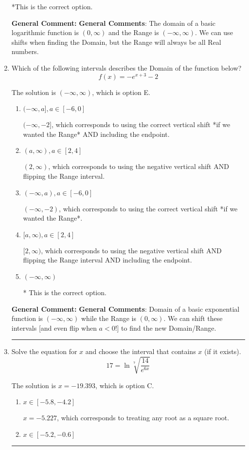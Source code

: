 \documentclass{extbook}[14pt]
\newcommand{\litem}[1]{\item #1

\rule{\textwidth}{0.4pt}}
\begin{document}
\begin{enumerate}
{\begin{enumerate}[label=\Alph*.]
*This is the correct option.
\end{enumerate}

\textbf{General Comment:} \textbf{General Comments}: The domain of a basic logarithmic function is $(0, \infty)$ and the Range is $(-\infty, \infty)$. We can use shifts when finding the Domain, but the Range will always be all Real numbers.
}
\litem{
Which of the following intervals describes the Domain of the function below?
\[ f(x) = -e^{x+3}-2 \]

The solution is \( (-\infty, \infty) \), which is option E.\begin{enumerate}[label=\Alph*.]
\item \( (-\infty, a], a \in [-6, 0] \)

$(-\infty, -2]$, which corresponds to using the correct vertical shift *if we wanted the Range* AND including the endpoint.
\item \( (a, \infty), a \in [2, 4] \)

$(2, \infty)$, which corresponds to using the negative vertical shift AND flipping the Range interval.
\item \( (-\infty, a), a \in [-6, 0] \)

$(-\infty, -2)$, which corresponds to using the correct vertical shift *if we wanted the Range*.
\item \( [a, \infty), a \in [2, 4] \)

$[2, \infty)$, which corresponds to using the negative vertical shift AND flipping the Range interval AND including the endpoint.
\item \( (-\infty, \infty) \)

* This is the correct option.
\end{enumerate}

\textbf{General Comment:} \textbf{General Comments}: Domain of a basic exponential function is $(-\infty, \infty)$ while the Range is $(0, \infty)$. We can shift these intervals [and even flip when $a<0$!] to find the new Domain/Range.
}
\litem{
 Solve the equation for $x$ and choose the interval that contains $x$ (if it exists).
\[  17 = \ln{\sqrt[7]{\frac{14}{e^{6x}}}} \]

The solution is \( x = -19.393 \), which is option C.\begin{enumerate}[label=\Alph*.]
\item \( x \in [-5.8, -4.2] \)

$x = -5.227$, which corresponds to treating any root as a square root.
\item \( x \in [-5.2, -0.6] \)


\end{enumerate}}
\end{enumerate}
\end{document}
